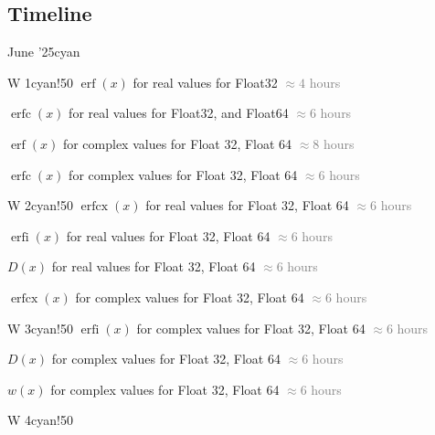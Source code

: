 \documentclass{article}
\newcommand{\release}[2]{%
        #1
        \hspace*{\fill}
        \textcolor{gray}{#2}\par}
\theoremstyle{mytheoremstyle}
\theoremstyle{mytheoremstyle}
\theoremstyle{myproblemstyle}
\begin{document}
    \subsection*{Timeline}
      \begin{releaseyear}{June '25}{cyan}
        \begin{releasequarter}{W 1}{cyan!50}
          \release{$\operatorname{erf}(x)$ for real values for Float32 }{$\approx 4$  hours}
          \release{$\operatorname{erfc}(x)$ for real values for Float32, and Float64}{$\approx 6$  hours}
          \release{$\operatorname{erf}(x)$ for complex values for Float 32, Float 64}{$\approx 8$  hours}
          \release{$\operatorname{erfc}(x)$ for complex values for Float 32, Float 64}{$\approx 6$  hours}
        \end{releasequarter}
        \begin{releasequarter}{W 2}{cyan!50}
          \release{$\operatorname{erfcx}(x)$ for real values for Float 32, Float 64}{$\approx 6$  hours}
          \release{$\operatorname{erfi}(x)$ for real values for Float 32, Float 64}{$\approx 6$  hours}
          \release{$D(x)$ for real values for Float 32, Float 64}{$\approx 6$  hours}

          \release{$\operatorname{erfcx }(x)$ for complex values for Float 32, Float 64}{$\approx 6$  hours}
        \end{releasequarter}
        \begin{releasequarter}{W 3}{cyan!50}
          \release{$\operatorname{erfi}(x)$ for complex values for Float 32, Float 64}{$\approx 6$  hours}
          \release{$D(x)$ for complex values for Float 32, Float 64}{$\approx 6$  hours}
          \release{$w(x)$ for complex values for Float 32, Float 64}{$\approx 6$  hours}
        \end{releasequarter}
        \begin{releasequarter}{W 4}{cyan!50}
        \end{releasequarter}
      \end{releaseyear}
\end{document}
